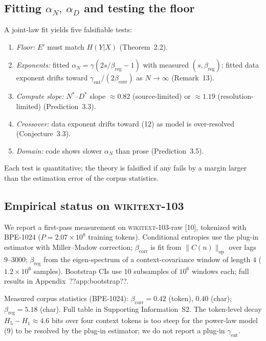 \documentclass[entropy,article,submit,moreauthors,pdftex]{mdpi}
\begin{document}
\subsection{Fitting $\alpha_N,\ \alpha_D$ and testing the floor}
A joint-law fit yields five falsifiable tests:
\begin{enumerate}[label=\textbf{(\arabic*)}]
\item \emph{Floor:} $E'$ must match $H(Y|X)$ (Theorem~2.2).
\item \emph{Exponents:} fitted $\alpha_N=\gamma(2s/\beta_{\mathrm{reg}}-1)$ with
  measured $(s,\beta_{\mathrm{reg}})$; fitted data exponent drifts toward
  $\gamma_{\mathrm{ent}}/(2\beta_{\mathrm{corr}})$ as $N\!\to\!\infty$
  (Remark~13).
\item \emph{Compute slope:} $N^*$--$D^*$ slope $\approx0.82$
  (source-limited) or $\approx1.19$ (resolution-limited)
  (Prediction~3.3).
\item \emph{Crossover:} data exponent drifts toward (12) as
  model is over-resolved (Conjecture~3.3).
\item \emph{Domain:} code shows slower $\alpha_N$ than prose
  (Prediction~3.5).
\end{enumerate}
Each test is quantitative; the theory is falsified if any fails by a
margin larger than the estimation error of the corpus statistics.

\subsection{Empirical status on \textsc{wikitext}-103}
\label{sec:empirical}

We report a first-pass measurement on \textsc{wikitext}-103-raw
[10], tokenized with BPE-1024 ($P=2.07\times10^8$ training
tokens). Conditional entropies use the plug-in estimator with Miller--Madow
correction; $\beta_{\mathrm{corr}}$ is fit from $\|C(n)\|_{\mathrm{op}}$ over lags
$9$--$3000$; $\beta_{\mathrm{reg}}$ from the eigen-spectrum of a context-covariance
window of length $4$ ($1.2\times10^6$ samples). Bootstrap CIs use $10$
subsamples of $10^6$ windows each; full results in
Appendix~??app:bootstrap??.

Measured corpus statistics (BPE-1024):
$\beta_{\mathrm{corr}}\!=\!0.42$ (token), $0.40$ (char);
$\beta_{\mathrm{reg}}\!=\!5.18$ (char).  Full table in Supporting Information~S2.
The token-level decay $H_5-H_1\!\approx\!4.6$ bits over four context tokens is
too steep for the power-law model (9) to be resolved by the
plug-in estimator; we do not report a plug-in $\gamma_{\mathrm{ent}}$.
\end{document}
